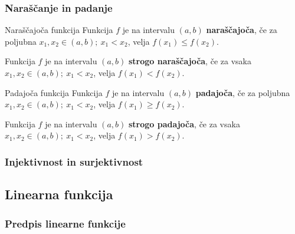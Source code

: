 
        \begin{frame}
            \frametitle{Naraščanje in padanje}

            \begin{alertblock}{Naraščajoča funkcija}
                Funkcija $f$ je na intervalu $(a,b)$ \textbf{naraščajoča}, če za poljubna $x_1,x_2\in(a,b); ~x_1<x_2$, velja $f(x_1)\leq f(x_2)$.
                
                Funkcija $f$ je na intervalu $(a,b)$ \textbf{strogo naraščajoča}, če za vsaka $x_1,x_2\in(a,b); ~x_1<x_2$, velja $f(x_1)<f(x_2)$.
            \end{alertblock}

            \begin{alertblock}{Padajoča funkcija}
                Funkcija $f$ je na intervalu $(a,b)$ \textbf{padajoča}, če za poljubna $x_1,x_2\in(a,b); ~x_1<x_2$, velja $f(x_1)\geq f(x_2)$.
                
                Funkcija $f$ je na intervalu $(a,b)$ \textbf{strogo padajoča}, če za vsaka $x_1,x_2\in(a,b); ~x_1<x_2$, velja $f(x_1)>f(x_2)$.
            \end{alertblock}

        \end{frame}



        \begin{frame}
            \frametitle{Injektivnost in surjektivnost}

        \end{frame}




    \subsection{Linearna funkcija}

        \begin{frame}
            \frametitle{Predpis linearne funkcije}
        \end{frame}



